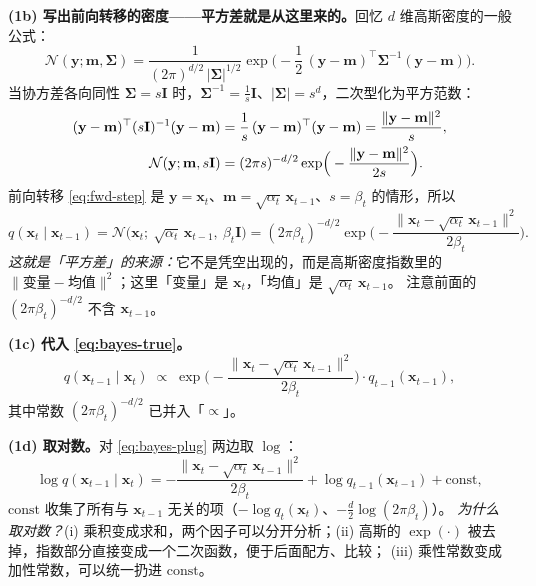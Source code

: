 \documentclass[a4paper,fontset=none,zihao=5]{ctexart}
\numberwithin{equation}{section}
\newcommand{\x}{\mathbf{x}}
\newcommand{\I}{\mathbf{I}}
\newcommand{\N}{\mathcal{N}}
\begin{document}
\textbf{(1b) 写出前向转移的密度——平方差就是从这里来的。}回忆 $d$ 维高斯密度的一般公式：
\begin{equation}
  \N(\mathbf{y};\mathbf{m},\boldsymbol{\Sigma})=\frac{1}{(2\pi)^{d/2}\,|\boldsymbol{\Sigma}|^{1/2}}
  \exp\!\Big(-\frac12\,(\mathbf{y}-\mathbf{m})^\top\boldsymbol{\Sigma}^{-1}(\mathbf{y}-\mathbf{m})\Big).
  \label{eq:gauss-density}
\end{equation}
当协方差各向同性 $\boldsymbol{\Sigma}=s\I$ 时，$\boldsymbol{\Sigma}^{-1}=\frac1s\I$、$|\boldsymbol{\Sigma}|=s^d$，二次型化为平方范数：
\begin{align}
  (\mathbf{y}-\mathbf{m})^\top(s\I)^{-1}(\mathbf{y}-\mathbf{m})&=\frac1s\,(\mathbf{y}-\mathbf{m})^\top(\mathbf{y}-\mathbf{m})=\frac{\|\mathbf{y}-\mathbf{m}\|^2}{s}, \notag\\
  \N(\mathbf{y};\mathbf{m},s\I)&=(2\pi s)^{-d/2}\exp\!\Big(-\frac{\|\mathbf{y}-\mathbf{m}\|^2}{2s}\Big).
  \label{eq:iso-gauss}
\end{align}
前向转移 \eqref{eq:fwd-step} 是 $\mathbf{y}=\x_t$、$\mathbf{m}=\sqrt{\alpha_t}\,\x_{t-1}$、$s=\beta_t$ 的情形，所以
\begin{equation}
  q(\x_t\mid\x_{t-1})=\N\!\big(\x_t;\ \sqrt{\alpha_t}\,\x_{t-1},\ \beta_t\I\big)
  =(2\pi\beta_t)^{-d/2}\exp\!\Big(-\frac{\|\x_t-\sqrt{\alpha_t}\,\x_{t-1}\|^2}{2\beta_t}\Big).
  \label{eq:fwd-density}
\end{equation}
\emph{这就是「平方差」的来源：}它不是凭空出现的，而是高斯密度指数里的 $\|\text{变量}-\text{均值}\|^2$；这里「变量」是 $\x_t$，「均值」是 $\sqrt{\alpha_t}\,\x_{t-1}$。
注意前面的 $(2\pi\beta_t)^{-d/2}$ 不含 $\x_{t-1}$。

\textbf{(1c) 代入 \eqref{eq:bayes-true}。}
\begin{equation}
  q(\x_{t-1}\mid\x_t)\;\propto\;\exp\!\Big(-\frac{\|\x_t-\sqrt{\alpha_t}\,\x_{t-1}\|^2}{2\beta_t}\Big)\cdot q_{t-1}(\x_{t-1}),
  \label{eq:bayes-plug}
\end{equation}
其中常数 $(2\pi\beta_t)^{-d/2}$ 已并入「$\propto$」。

\textbf{(1d) 取对数。}对 \eqref{eq:bayes-plug} 两边取 $\log$：
\begin{equation}
  \log q(\x_{t-1}\mid\x_t)=-\frac{\|\x_t-\sqrt{\alpha_t}\,\x_{t-1}\|^2}{2\beta_t}+\log q_{t-1}(\x_{t-1})+\mathrm{const},
  \label{eq:log-bayes}
\end{equation}
$\mathrm{const}$ 收集了所有与 $\x_{t-1}$ 无关的项（$-\log q_t(\x_t)$、$-\frac d2\log(2\pi\beta_t)$）。
\emph{为什么取对数？}(i) 乘积变成求和，两个因子可以分开分析；(ii) 高斯的 $\exp(\cdot)$ 被去掉，指数部分直接变成一个二次函数，便于后面配方、比较；
(iii) 乘性常数变成加性常数，可以统一扔进 $\mathrm{const}$。
\end{document}
